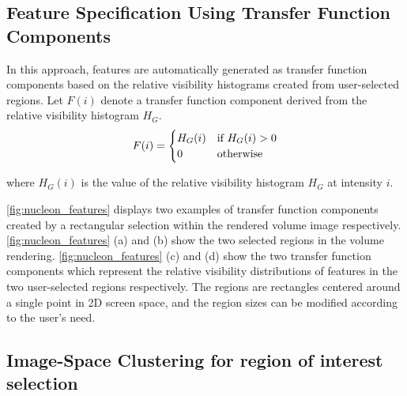 \documentclass[twoside,twocolumn,10pt]{article}
\begin{document}


\subsection{Feature Specification Using Transfer Function Components}
In this approach, features are automatically generated as transfer function components based on the relative visibility histograms created from user-selected regions.
Let $F(i)$ denote a transfer function component derived from the relative visibility histogram $H_{G}$.
\[
F(i) =
\begin{cases}
H_{G}(i) & \text{if $ H_{G}(i)>0 $} \\
0 & \text{otherwise}
\end{cases}
\]

where $ H_{G}(i) $ is the value of the relative visibility histogram $ H_{G} $ at intensity $ i $.

\autoref{fig:nucleon_features} displays two examples of transfer function components created by a rectangular selection within the rendered volume image respectively.
\autoref{fig:nucleon_features} (a) and (b) show the two selected regions in the volume rendering. \autoref{fig:nucleon_features} (c) and (d) show the two transfer function components which represent the relative visibility distributions of features in the two user-selected regions respectively. The regions are rectangles centered around a single point in 2D screen space, and the region sizes can be modified according to the user's need.

\subsection{Image-Space Clustering for region of interest selection}
\end{document}
